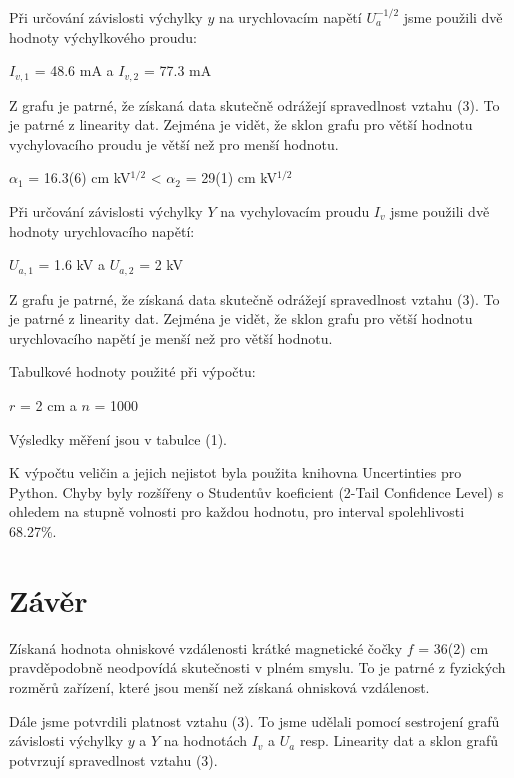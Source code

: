 \documentclass[a4paper,11pt]{article}
\begin{document}
    \hspace{10pt}
    \begin{minipage}[t]{0.5\textwidth} 
                \par Při určování závislosti výchylky $y$ na urychlovacím napětí $U_a^{-1/2}$ jsme použili dvě hodnoty výchylkového proudu:
                \begin{center}
                    $I_{v,1}$ = 48.6 mA a $I_{v,2}$ = 77.3 mA
                \end{center}
                Z grafu je patrné, že získaná data skutečně odrážejí spravedlnost vztahu (3). To je patrné z linearity dat. Zejména je vidět, že sklon grafu pro větší hodnotu vychylovacího proudu je větší než pro menší hodnotu. 
                \begin{center}
                    $\alpha_1$ = 16.3(6) cm kV$^{1/2}$ < $\alpha_2$ = 29(1) cm kV$^{1/2}$
                \end{center}
                \par Při určování závislosti výchylky $Y$ na vychylovacím proudu $I_v$ jsme použili dvě hodnoty urychlovacího napětí:
                \begin{center}
                    $U_{a,1}$ = 1.6 kV a $U_{a,2}$ = 2 kV
                \end{center}
                Z grafu je patrné, že získaná data skutečně odrážejí spravedlnost vztahu (3). To je patrné z linearity dat. Zejména je vidět, že sklon grafu pro větší hodnotu urychlovacího napětí je menší než pro větší hodnotu.
                \par Tabulkové hodnoty použité při výpočtu:
                \begin{center}
                    $r$ = 2 cm a $n$ = 1000 
                \end{center}
                \par Výsledky měření jsou v tabulce (1).
                \vspace{10pt}
                \par K výpočtu veličin a jejich nejistot byla použita knihovna Uncertinties pro Python\cite{uncertainties}. Chyby byly rozšířeny o Studentův koeficient (2-Tail Confidence Level) s ohledem na stupně volnosti pro každou hodnotu, pro interval spolehlivosti 68.27\%.
        
        \section{Závěr} 
                Získaná hodnota ohniskové vzdálenosti krátké magnetické čočky $f$ = 36(2) cm pravděpodobně neodpovídá skutečnosti v plném smyslu. To je patrné z fyzických rozměrů zařízení, které jsou menší než získaná ohnisková vzdálenost. 
                \par Dále jsme potvrdili platnost vztahu (3). To jsme udělali pomocí sestrojení grafů závislosti výchylky $y$ a $Y$ na hodnotách $I_v$ a $U_a$ resp. Linearity dat a sklon grafů potvrzují spravedlnost vztahu (3).


\end{minipage}
\end{document}
